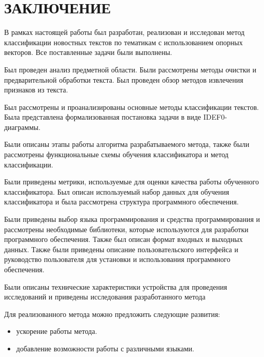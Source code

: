 \part*{ЗАКЛЮЧЕНИЕ}
В рамках настоящей работы был разработан, реализован и исследован метод классификации новостных текстов по тематикам с использованием опорных векторов. Все поставленные задачи были выполнены.

Был проведен анализ предметной области. Были рассмотрены методы очистки и предварительной обработки текста. Был проведен обзор методов извлечения признаков из текста.

Был рассмотрены и проанализированы основные методы классификации текстов. Была представлена формализованная постановка задачи в виде IDEF0-диаграммы.

Были описаны этапы работы алгоритма разрабатываемого метода, также были рассмотрены функциональные схемы обучения классификатора и метод классификации. 

Были приведены метрики, используемые для оценки качества работы обученного классификатора. Был описан используемый набор данных для обучения классификатора и была рассмотрена структура программного обеспечения.

Были приведены выбор языка программирования и средства программирования и рассмотрены необходимые библиотеки, которые используются для разработки программного обеспечения. Также был описан формат входных и выходных данных. Также были приведены описание пользовательского интерфейса и руководство пользователя для установки и использования программного обеспечения.

Были описаны технические характеристики устройства для проведения исследований и приведены исследования разработанного метода

Для реализованного метода можно предложить следующие развития:
\begin{itemize}[label = ---]
    \item ускорение работы метода.
    \item добавление возможности работы с различными языками.
\end{itemize}

